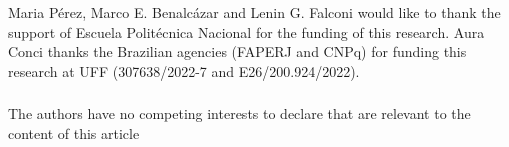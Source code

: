 \documentclass[runningheads]{llncs}
\begin{document}


\begin{credits}
  \subsubsection{\ackname} Maria Pérez, Marco E. Benalcázar and Lenin
  G. Falconi would like to thank the support of Escuela Politécnica
  Nacional for the funding of this research. Aura Conci thanks the
  Brazilian agencies (FAPERJ and CNPq) for funding this research at
  UFF (307638/2022-7 and E26/200.924/2022).


  \subsubsection{\discintname}
  The authors have no competing interests to declare that are relevant
  to the content of this article
\end{credits}
% 
%
%
\newpage


\end{document}
